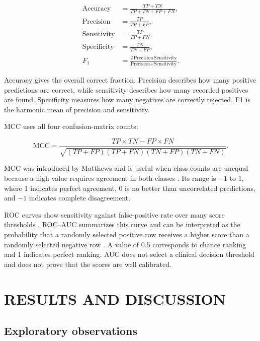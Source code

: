\documentclass[pdflatex,sn-vancouver-num]{sn-jnl}
\begin{document}
\begin{align}
\text{Accuracy} &= \frac{TP+TN}{TP+TN+FP+FN}, \label{eq:accuracy}\\
\text{Precision} &= \frac{TP}{TP+FP}, \label{eq:precision}\\
\text{Sensitivity} &= \frac{TP}{TP+FN}, \label{eq:sensitivity}\\
\text{Specificity} &= \frac{TN}{TN+FP}, \label{eq:specificity}\\
F_1 &= \frac{2\,\text{Precision}\,\text{Sensitivity}}
{\text{Precision}+\text{Sensitivity}}. \label{eq:f1}
\end{align}

Accuracy gives the overall correct fraction. Precision describes how many positive predictions are correct, while sensitivity describes how many recorded positives are found. Specificity measures how many negatives are correctly rejected. F1 is the harmonic mean of precision and sensitivity.

MCC uses all four confusion-matrix counts:

\begin{equation}
\mathrm{MCC}=\frac{TP\times TN-FP\times FN}
{\sqrt{(TP+FP)(TP+FN)(TN+FP)(TN+FN)}}.
\label{eq:mcc}
\end{equation}

MCC was introduced by Matthews \cite{matthews1975mcc} and is useful when class counts are unequal because a high value requires agreement in both classes \cite{chicco2020mcc}. Its range is $-1$ to 1, where 1 indicates perfect agreement, 0 is no better than uncorrelated predictions, and $-1$ indicates complete disagreement.

ROC curves show sensitivity against false-positive rate over many score thresholds \cite{fawcett2006roc}. ROC--AUC summarizes this curve and can be interpreted as the probability that a randomly selected positive row receives a higher score than a randomly selected negative row \cite{hanley1982auc}. A value of 0.5 corresponds to chance ranking and 1 indicates perfect ranking. AUC does not select a clinical decision threshold and does not prove that the scores are well calibrated.

\section{RESULTS AND DISCUSSION}\label{sec:results}

\subsection{Exploratory observations}\label{subsec:eda}
\end{document}
